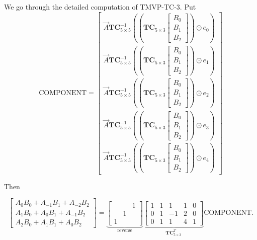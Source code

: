 \documentclass[
11pt,notheorems,hyperref={pdfauthor=whatever}
]{beamer}
\begin{document}
\begin{frame}
    We go through the detailed computation of TMVP-TC-3.
Put
\[
\mathrm{COMPONENT} = 
\begin{bmatrix}
        \vec{A} \mathbf{TC}_{5\times 5}^{-1} 
        \left(\left(\mathbf{TC}_{5\times 3}\begin{bmatrix}B_{0}\\B_{1}\\B_{2}\end{bmatrix}\right)\odot e_{0} \right)\\
        \vec{A} \mathbf{TC}_{5\times 5}^{-1} 
        \left(\left(\mathbf{TC}_{5\times 3}\begin{bmatrix}B_{0}\\B_{1}\\B_{2}\end{bmatrix}\right)\odot e_{1} \right)\\
        \vec{A} \mathbf{TC}_{5\times 5}^{-1} 
        \left(\left(\mathbf{TC}_{5\times 3}\begin{bmatrix}B_{0}\\B_{1}\\B_{2}\end{bmatrix}\right)\odot e_{2} \right)\\
        \vec{A} \mathbf{TC}_{5\times 5}^{-1} 
        \left(\left(\mathbf{TC}_{5\times 3}\begin{bmatrix}B_{0}\\B_{1}\\B_{2}\end{bmatrix}\right)\odot e_{3} \right)\\
        \vec{A} \mathbf{TC}_{5\times 5}^{-1} 
        \left(\left(\mathbf{TC}_{5\times 3}\begin{bmatrix}B_{0}\\B_{1}\\B_{2}\end{bmatrix}\right)\odot e_{4} \right)
\end{bmatrix}
\]


\end{frame}
\begin{frame}
    Then

    \[
        \begin{bmatrix}
            A_{0}B_{0} + A_{-1}B_{1} + A_{-2}B_{2}\\
            A_{1}B_{0} + A_{0}B_{1} + A_{-1}B_{2}\\
            A_{2}B_{0} + A_{1}B_{1} + A_{0}B_{2}
        \end{bmatrix}
        =
        \underbrace{\begin{bmatrix}
            &&1\\
            &1&\\
            1&&
        \end{bmatrix}}_{\text{reverse}}
        \underbrace{\begin{bmatrix}
            1 & 1 & 1 & 1 & 0\\
            0 & 1 & -1 & 2 &0\\
            0 & 1 & 1 & 4 & 1
        \end{bmatrix}}_{\mathbf{TC}_{5\times 3}^T}
        \mathrm{COMPONENT}.
    \]
\end{frame}
\end{document}
